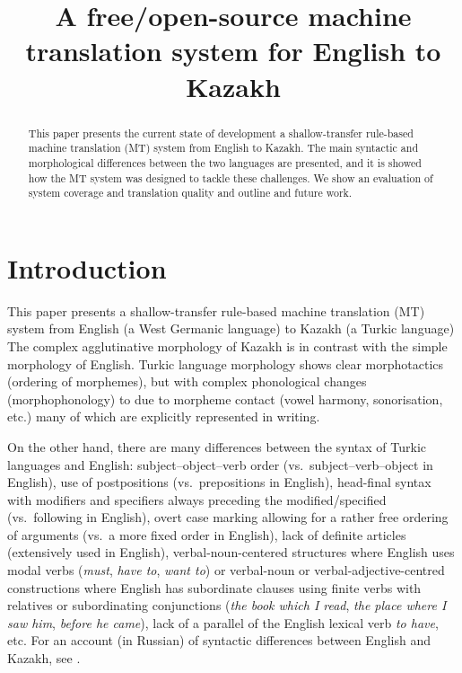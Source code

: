 \documentclass[11pt]{article}
\title{A free/open-source machine translation system for English to Kazakh}
\date{}
\begin{document}
\maketitle 
\renewcommand{\baselinestretch}{0.97} %
 

\begin{abstract}
This paper presents the current state of development a shallow-transfer rule-based machine translation (MT) system from English to Kazakh. The main syntactic and morphological differences 
between the two languages are presented, and it is showed how the MT 
system was designed to tackle these challenges. We show an evaluation of system coverage and 
translation quality and outline and future work.
\end{abstract}

\section{Introduction}

This paper presents a shallow-transfer rule-based machine translation (MT) system from English 
(a West Germanic language) to Kazakh (a Turkic language)
The complex agglutinative morphology of Kazakh 
is in contrast with the simple morphology of English.
Turkic language morphology shows clear morphotactics (ordering of morphemes), but with 
complex phonological changes (morphophonology) to due to morpheme contact (vowel harmony, 
sonorisation, etc.) many of which are explicitly represented in writing.

On the other hand, there are many differences between the syntax of Turkic languages 
and English: subject–object–verb order (vs.\ subject–verb–object in English), use of 
postpositions (vs.\ prepositions in English), head-final syntax with modifiers and specifiers 
always preceding the modified/specified (vs.\ following in English), overt case marking allowing 
for a rather free ordering of arguments (vs.\ a more fixed order in English), lack of definite 
articles (extensively used in English), verbal-noun-centered structures where English uses modal 
verbs (\emph{must}, \emph{have to}, \emph{want to}) or verbal-noun or verbal-adjective-centred constructions where 
English has subordinate clauses using finite verbs with relatives or subordinating 
conjunctions (\emph{the book which I read}, \emph{the place where I saw him}, \emph{before he came}), lack of a parallel 
of the English lexical verb \emph{to have}, etc. For an account (in Russian) of 
syntactic differences between English and Kazakh, see \cite{pecherskih2012}.
\end{document}
